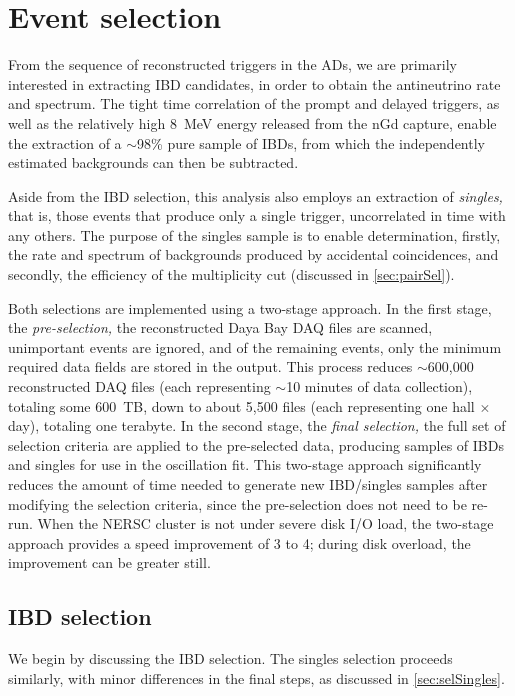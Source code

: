 \documentclass[../thesis.tex]{subfiles}
\begin{document}
\chapter{Event selection}
\label{chap:selection}

From the sequence of reconstructed triggers in the ADs, we are primarily interested in extracting IBD candidates, in order to obtain the antineutrino rate and spectrum. The tight time correlation of the prompt and delayed triggers, as well as the relatively high 8~MeV energy released from the nGd capture, enable the extraction of a $\sim$98\% pure sample of IBDs, from which the independently estimated backgrounds can then be subtracted.

Aside from the IBD selection, this analysis also employs an extraction of \emph{singles,} that is, those events that produce only a single trigger, uncorrelated in time with any others. The purpose of the singles sample is to enable determination, firstly, the rate and spectrum of backgrounds produced by accidental coincidences, and secondly, the efficiency of the multiplicity cut (discussed in \autoref{sec:pairSel}).

Both selections are implemented using a two-stage approach. In the first stage, the \emph{pre-selection,} the reconstructed Daya Bay DAQ files are scanned, unimportant events are ignored, and of the remaining events, only the minimum required data fields are stored in the output. This process reduces $\sim$600,000 reconstructed DAQ files (each representing $\sim$10 minutes of data collection), totaling some 600~TB, down to about 5,500 files (each representing one hall $\times$ day), totaling one terabyte. In the second stage, the \emph{final selection,} the full set of selection criteria are applied to the pre-selected data, producing samples of IBDs and singles for use in the oscillation fit. This two-stage approach significantly reduces the amount of time needed to generate new IBD/singles samples after modifying the selection criteria, since the pre-selection does not need to be re-run. When the NERSC cluster is not under severe disk I/O load, the two-stage approach provides a speed improvement of 3 to 4; during disk overload, the improvement can be greater still.

\section{IBD selection}
\label{sec:selIBDs}

We begin by discussing the IBD selection. The singles selection proceeds similarly, with minor differences in the final steps, as discussed in \autoref{sec:selSingles}.
\end{document}
